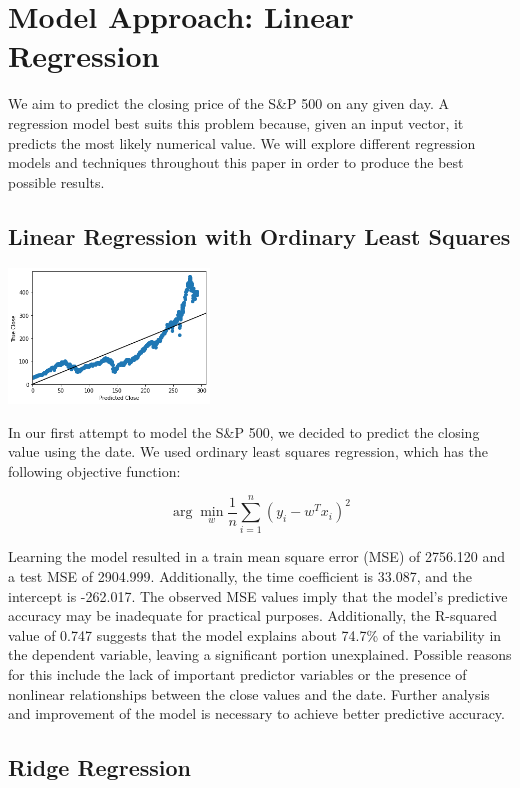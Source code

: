 \documentclass[final,5p,times,twocolumn,authoryear, 12pt]{elsarticle}
\begin{document}
\section{Model Approach: Linear Regression}
    We aim to predict the closing price of the S\&P 500 on any given day. A regression model best suits this problem because, given an input vector, it predicts the most likely numerical value. We will explore different regression models and techniques throughout this paper in order to produce the best possible results.
    

\subsection{Linear Regression with Ordinary Least Squares}


	\includegraphics[width=0.4\textwidth, angle=0]{linregOLS.png}	

In our first attempt to model the S\&P 500, we decided to predict the closing value using the date. We used ordinary least squares regression, which has the following objective function:

\begin{adjustwidth}{1.6cm}{}
\[
   \arg \min_w \frac{1}{n} \sum_{i = 1}^{n} (y_i - w^T x_i)^2
\]
\end{adjustwidth}

Learning the model resulted in a train mean square error (MSE) of 2756.120 and a test MSE of 2904.999. Additionally, the time coefficient is 33.087, and the intercept is -262.017. The observed MSE values imply that the model's predictive accuracy may be inadequate for practical purposes. Additionally, the R-squared value of 0.747 suggests that the model explains about 74.7\% of the variability in the dependent variable, leaving a significant portion unexplained. Possible reasons for this include the lack of important predictor variables or the presence of nonlinear relationships between the close values and the date. Further analysis and improvement of the model is necessary to achieve better predictive accuracy.

\subsection{Ridge Regression}
\end{document}
